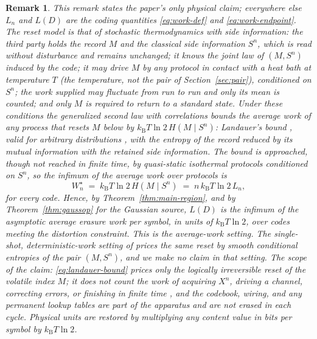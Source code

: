 \documentclass[11pt,onecolumn]{IEEEtran}
\newtheorem{remark}[theorem]{Remark}
\newcommand{\kb}{k_{\mathrm{B}}}
\begin{document}
\begin{remark}\label{rem:thermo}
This remark states the paper's only physical claim; everywhere else
$L_n$ and $L(D)$ are the coding quantities \eqref{eq:work-def} and
\eqref{eq:work-endpoint}. The reset model is that of stochastic
thermodynamics with side information: the third party holds the record
$M$ and the classical side information $S^n$, which is read without
disturbance and remains unchanged; it knows the joint law of $(M,S^n)$
induced by the code; it may drive $M$ by any protocol in contact with a
heat bath at temperature $T$ (the temperature, not the pair of Section~\ref{sec:pair}), conditioned on $S^n$; the work supplied
may fluctuate from run to run and only its mean is counted; and only
$M$ is required to return to a standard state. Under these conditions
the generalized second law with correlations
\cite{sagawa2012,parrondo2015} bounds the average work of any process
that resets $M$ below by $\kb T\ln2\,H(M\mid S^n)$: Landauer's bound
\cite{landauer1961}, valid for arbitrary distributions
\cite{esposito2011}, with the entropy of the record reduced by its
mutual information with the retained side information. The bound is
approached, though not reached in finite time, by quasi-static
isothermal protocols conditioned on $S^n$, so the infimum of the
average work over protocols is
\begin{equation}
 W_n^{\star}\;=\;\kb T\ln2\,H(M\mid S^n)\;=\;n\,\kb T\ln2\,L_n ,
 \label{eq:landauer-bound}
\end{equation}
for every code. Hence, by Theorem~\ref{thm:main-region}, and by
Theorem~\ref{thm:gaussop} for the Gaussian source, $L(D)$ is the
infimum of the asymptotic average erasure work per symbol, in units of
$\kb T\ln2$, over codes meeting the distortion constraint. This is the average-work setting. The single-shot,
deterministic-work setting of \cite{delrio2011,faist2015} prices the
same reset by smooth conditional entropies of the pair $(M,S^n)$, and
we make no claim in that setting. The scope of the claim:
\eqref{eq:landauer-bound} prices only the logically irreversible reset
of the volatile index $M$; it does not count the work of acquiring
$X^n$, driving a channel, correcting errors, or finishing in finite time
\cite{landauer1961,bennett1973}, and the codebook, wiring, and any
permanent lookup tables are part of the apparatus and are not erased in
each cycle. Physical units are restored by multiplying any content value
in bits per symbol by $\kb T\ln2$.
\end{remark}
\end{document}
